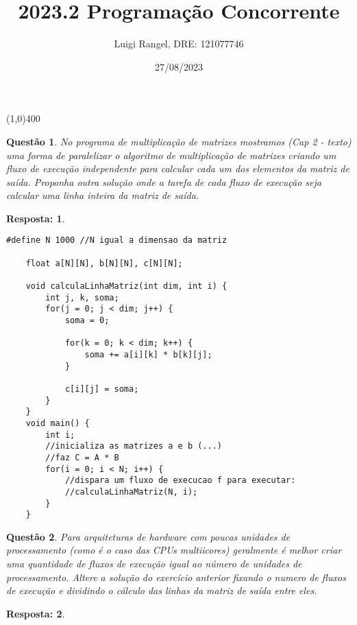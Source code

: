 \documentclass[a4paper, 12pt]{article}
\title{2023.2 Programação Concorrente}
\author{Luigi Rangel, DRE: 121077746}
\date{27/08/2023}
\newtheorem{question}{Questão}
\theoremstyle{dotless}
\newtheorem*{answer}{\textbf{Resposta:}}
\begin{document}
\maketitle

\begin{center}
    \line(1,0){400}
\end{center} \newpage

\begin{question}
    No programa de multiplicação de matrizes mostramos (Cap 2 - texto) uma forma de paralelizar o algoritmo de multiplicação de matrizes criando um fluxo de execução independente para calcular cada um dos elementos da matriz de saída. Proponha outra solução onde a tarefa de cada fluxo de execução seja calcular uma linha inteira da matriz de saída.
\end{question}
\begin{answer}
\end{answer}

\begin{lstlisting}[style=CStyle]
    #define N 1000 //N igual a dimensao da matriz

    float a[N][N], b[N][N], c[N][N];

    void calculaLinhaMatriz(int dim, int i) {
        int j, k, soma;
        for(j = 0; j < dim; j++) {
            soma = 0;

            for(k = 0; k < dim; k++) {
                soma += a[i][k] * b[k][j];
            }

            c[i][j] = soma;
        }
    }
    void main() {
        int i;
        //inicializa as matrizes a e b (...)
        //faz C = A * B
        for(i = 0; i < N; i++) {
            //dispara um fluxo de execucao f para executar:
            //calculaLinhaMatriz(N, i);
        }
    }
\end{lstlisting}

\newpage

\begin{question}
    Para arquiteturas de hardware com poucas unidades de processamento (como é o caso das CPUs multiicores) geralmente é melhor criar uma quantidade de fluxos de execução igual ao número de unidades de processamento. Altere a solução do exercício anterior fixando o numero de fluxos de execução e dividindo o cálculo das linhas da matriz de saída entre eles.
\end{question}
\begin{answer}
\end{answer}
\end{document}
